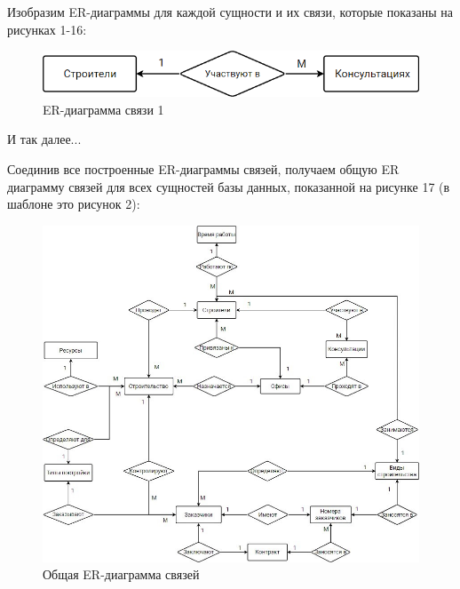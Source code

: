 \documentclass{../SIBGU-state}
\begin{document}
Изобразим ER-диаграммы для каждой сущности и их связи, которые показаны на рисунках 1-16: \par
\begin{figure}[htb]
	\centering
	\includegraphics[width=1\textwidth]{ris/ris1.png}
	\parskip=1pt
	\caption{ER-диаграмма связи 1}
	\label{fig:in_appendix}
\end{figure}\par
И так далее...\par\bigskip
Соединив все построенные ER-диаграммы связей, получаем общую ER диаграмму связей для всех сущностей базы данных, показанной на рисунке 17 (в шаблоне это рисунок 2): \par
\begin{figure}[htb]
	\centering
	\includegraphics[width=1\textwidth]{ris/ris2.jpg}
	\parskip=1pt
	\caption{Общая ER-диаграмма связей}
	\label{fig:in_appendix}
\end{figure}\par
\end{document}
